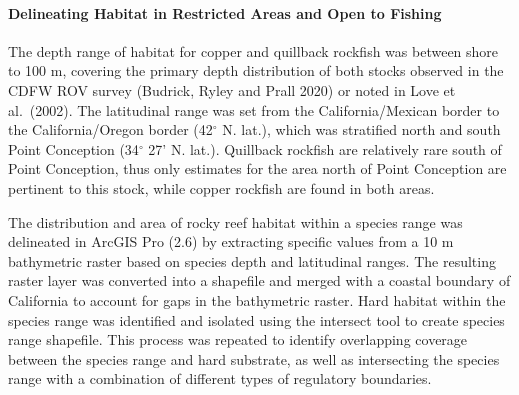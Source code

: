 \documentclass[11pt,
  english,
  a4paper,
]{article}
\begin{document}
\leavevmode\tagmcend\tagstructend\par


\hypertarget{delineating-habitat-in-restricted-areas-and-open-to-fishing}{%
\paragraph{Delineating Habitat in Restricted Areas and Open to Fishing}\label{delineating-habitat-in-restricted-areas-and-open-to-fishing}}

\leavevmode\tagmcend\tagstructend


The depth range of habitat for copper and quillback rockfish was between shore to 100 m, covering the primary depth distribution of both stocks observed in the CDFW ROV survey (Budrick, Ryley and Prall 2020) or noted in Love et al.~(2002). The latitudinal range was set from the California/Mexican border to the California/Oregon border (42{\(^\circ\)\leavevmode\tagmcend\tagstructend} N. lat.), which was stratified north and south Point Conception (34{\(^\circ\)\leavevmode\tagmcend\tagstructend} 27' N. lat.). Quillback rockfish are relatively rare south of Point Conception, thus only estimates for the area north of Point Conception are pertinent to this stock, while copper rockfish are found in both areas.

\leavevmode\tagmcend\tagstructend\par


The distribution and area of rocky reef habitat within a species range was delineated in ArcGIS Pro (2.6) by extracting specific values from a 10 m bathymetric raster based on species depth and latitudinal ranges. The resulting raster layer was converted into a shapefile and merged with a coastal boundary of California to account for gaps in the bathymetric raster. Hard habitat within the species range was identified and isolated using the intersect tool to create species range shapefile. This process was repeated to identify overlapping coverage between the species range and hard substrate, as well as intersecting the species range with a combination of different types of regulatory boundaries.

\leavevmode\tagmcend\tagstructend\par
\end{document}
